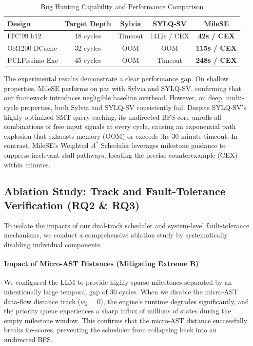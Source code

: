 \documentclass[conference]{IEEEtran}
\begin{document}
\begin{table}[htbp]
\centering
\caption{Bug Hunting Capability and Performance Comparison}
\label{tab:bughunting}
\begin{tabular}{lcccc}
\toprule
\textbf{Design} & \textbf{Target Depth} & \textbf{Sylvia} & \textbf{SYLQ-SV} & \textbf{MileSE} \\
\midrule
ITC'99 b12      & 18 cycles & Timeout  & 1412s / CEX & \textbf{42s / CEX} \\
OR1200 DCache   & 32 cycles & OOM      & OOM         & \textbf{115s / CEX} \\
PULPissimo Exc  & 45 cycles & OOM      & Timeout     & \textbf{248s / CEX} \\
\bottomrule
\end{tabular}
\end{table}

The experimental results demonstrate a clear performance gap. On shallow properties, MileSE performs on par with Sylvia and SYLQ-SV, confirming that our framework introduces negligible baseline overhead. However, on deep, multi-cycle properties, both Sylvia and SYLQ-SV consistently fail. Despite SYLQ-SV's highly optimized SMT query caching, its undirected BFS core unrolls all combinations of free input signals at every cycle, causing an exponential path explosion that exhausts memory (OOM) or exceeds the 30-minute timeout. In contrast, MileSE's Weighted $A^*$ Scheduler leverages milestone guidance to suppress irrelevant stall pathways, locating the precise counterexample (CEX) within minutes.

\subsection{Ablation Study: Track and Fault-Tolerance Verification (RQ2 \& RQ3)}
To isolate the impacts of our dual-track scheduler and system-level fault-tolerance mechanisms, we conduct a comprehensive ablation study by systematically disabling individual components.

\paragraph{Impact of Micro-AST Distances (Mitigating Extreme B)}
We configured the LLM to provide highly sparse milestones separated by an intentionally large temporal gap of 30 cycles. When we disable the micro-AST data-flow distance track ($w_2 = 0$), the engine's runtime degrades significantly, and the priority queue experiences a sharp influx of millions of states during the empty milestone window. This confirms that the micro-AST distance successfully breaks tie-scores, preventing the scheduler from collapsing back into an undirected BFS.
\end{document}
